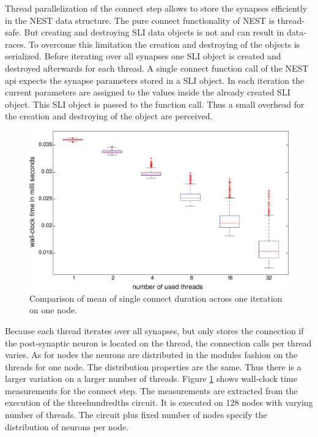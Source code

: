 Thread parallelization of the connect step allows to store the synapses efficiently in the NEST data structure.
The pure connect functionality of NEST is thread-safe. But creating and destroying SLI data objects is not and can result
in data-races. To overcome this limitation the creation and destroying of the objects is serialized.
Before iterating over all synapses one SLI object is created and destroyed afterwards for each thread.
A single connect function call of the NEST api expects the synapse parameters stored in a SLI object.
In each iteration the current parameters are assigned to the values inside the already created SLI object.
This SLI object is passed to the function call.
Thus a small overhead for the creation and destroying of the object are perceived.
\begin{figure}[ht!]
\centering
\includegraphics[scale=0.3]{pictures/boxplot_new_con_dt_1_300_edit.eps}
\caption{Comparison of mean of single connect duration across one iteration on one node.}
\label{boxplotnewcon}
\end{figure}
Because each thread iterates over all synapses, but only stores the connection if the post-synaptic neuron is located on
the thread, the connection calls per thread varies.
As for nodes the neurons are distributed in the modules fashion on the threads for one node.
The distribution properties are the same. Thus there is a larger variation on a larger number of threads.
Figure \ref{boxplotnewcon} shows wall-clock time measurements for the connect step. The measurements are
extracted from the execution of the threehundredths circuit. It is executed on 128 nodes with varying number of
threads. The circuit plus fixed number of nodes specify the distribution of neurons per node.

